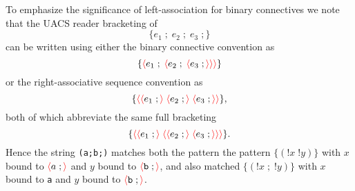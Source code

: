 \documentclass{article}
\newcommand{\fopen}{{\color{red} \langle}}
\newcommand{\fclose}{{\color{red} \rangle}}
\begin{document}
To emphasize the significance of left-association for binary connectives we note that
the UACS reader bracketing of
$$\{e_1\;;\;e_2\;;\;e_3\;;\}$$
can be written using either the binary connective convention as
$$\{\fopen e_1\;;\;\fopen e_2\;;\;\fopen e_3\;;\fclose\fclose\fclose\}$$
or the right-associative sequence convention as
$$\{\fopen \fopen e_1\;;\fclose \;\fopen e_2\;;\fclose \;\fopen e_3\;;\fclose\fclose\},$$
both of which abbreviate the same full bracketing
$$\{\fopen \fopen e_1\;;\fclose \;\fopen \fopen e_2\;;\fclose \;\fopen e_3\;;\fclose\fclose\fclose\}.$$
Hence the string {\tt (a\;;\;b\;;)} matches both the pattern
the pattern $\{(!x\;!y)\}$ with $x$ bound to $\fopen a\;;\fclose$ and $y$ bound to $\fopen\mathtt{b}\;;\fclose$,
and also matched  $\{(!x\;;\;!y)\}$ with $x$ bound to {\tt a} and $y$ bound to  $\fopen\mathtt{b}\;;\fclose$.
\end{document}
